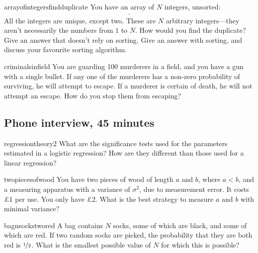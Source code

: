 \documentclass[a4paper]{article}
\begin{document}
\begin{question}{arrayofintegersfindduplicate}
You have an array of $N$ integers, unsorted:
\begin{align*}
  [n_1, n_2, \ldots , n_{N} ]
  \text{.}
\end{align*}
All the integers are unique, except two.
These are $N$ arbitrary integers---they aren't necessarily the numbers from $1$ to $N$.
How would you find the duplicate?
Give an answer that doesn't rely on sorting.
Give an answer with sorting, and discuss your favourite sorting algorithm.
\end{question}


\begin{question}{criminalsinfield}
You are guarding 100 murderers in a field, and you have a gun with a single bullet.
If any one of the murderers has a non-zero probability of surviving, he will attempt to escape. If a murderer is certain of death, he will not attempt an escape.
How do you stop them from escaping?
\end{question}

\clearpage





\clearpage
\subsection{Phone interview, 45 minutes}
\begin{question}{regressiontheory2}
What are the significance tests used for the parameters estimated in a logistic regression?
How are they different than those used for a linear regression?
\end{question}


\begin{question}{twopiecesofwood}
You have two pieces of wood of length $a$ and $b$, where $a<b$, and a measuring apparatus with a variance of $\sigma^2$, due to measurement error.
It costs \pounds 1 per use.
You only have \pounds2.
What is the best strategy to measure $a$ and $b$ with minimal variance?
\end{question}



\begin{question}{bagnsockstwored}
A bag contains $N$ socks, some of which are black, and some of which are red.
If two random socks are picked, the probability that they are both red is $\nicefrac{1}{2}$.
What is the smallest possible value of $N$ for which this is possible?
\end{question}
\end{document}
